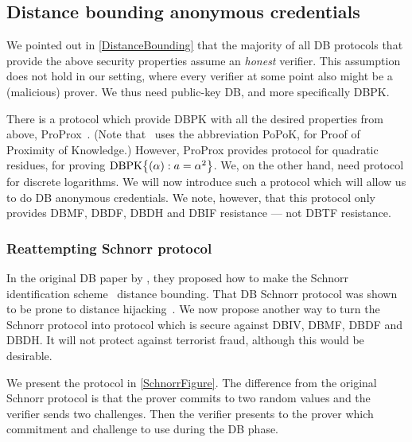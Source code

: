\subsection{Distance bounding anonymous credentials}%
\label{DB-anon-cred}


We pointed out in \cref{DistanceBounding} that the majority of all \ac{DB} 
protocols that provide the above security properties assume an \emph{honest} 
verifier.
This assumption does not hold in our setting, where every verifier at some point 
also might be a (malicious) prover.
We thus need public-key \ac{DB}, and more specifically \ac{DBPK}.

There is a protocol which provide \ac{DBPK} with all the desired properties from 
above, ProProx~\cite{ProProx}.
(Note that~\cite{ProProx} uses the abbreviation PoPoK, for Proof of Proximity of 
Knowledge.)
However, ProProx provides  protocol for quadratic residues, \ie for 
proving \(\DBPK[\alpha][a = \alpha^2]\).
We, on the other hand, need  protocol for discrete logarithms.
We will now introduce such a protocol which will allow us to do \ac{DB} 
anonymous credentials.
We note, however, that this protocol only provides \ac{DBMF}, \ac{DBDF}, 
\ac{DBDH} and \ac{DBIF} resistance --- \ie not \ac{DBTF} resistance.

\subsubsection{Reattempting  Schnorr protocol}


In the original \ac{DB} paper by \citet{DistanceBounding}, they proposed how to 
make the Schnorr identification scheme~\cite{Schnorr} distance bounding.
That \ac{DB} Schnorr protocol was shown to be prone to distance 
hijacking~\cite{DistanceHijacking}.
We now propose another way to turn the Schnorr protocol into  protocol 
which is secure against \ac{DBIV}, \ac{DBMF}, \ac{DBDF} and \ac{DBDH}.
It will not protect against terrorist fraud, although this would be desirable.

We present the protocol in \cref{SchnorrFigure}.
The difference from the original Schnorr protocol is that the prover commits to 
two random values and the verifier sends two challenges.
Then the verifier presents to the prover which commitment and challenge to use 
during the \ac{DB} phase.

